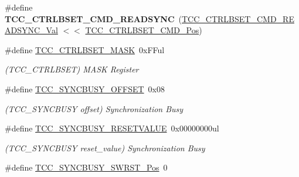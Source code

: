 \begin{DoxyCompactItemize}
\item 
\hypertarget{group___s_a_m_l21___t_c_c_ga93ea7605934c54f834dbc78cb70c4309}{}\#define {\bfseries T\+C\+C\+\_\+\+C\+T\+R\+L\+B\+S\+E\+T\+\_\+\+C\+M\+D\+\_\+\+R\+E\+A\+D\+S\+Y\+N\+C}~(\hyperlink{group___s_a_m_l21___t_c_c_ga3c90262c803fdab651abc28a04bf6340}{T\+C\+C\+\_\+\+C\+T\+R\+L\+B\+S\+E\+T\+\_\+\+C\+M\+D\+\_\+\+R\+E\+A\+D\+S\+Y\+N\+C\+\_\+\+Val} $<$$<$ \hyperlink{group___s_a_m_l21___t_c_c_ga67d1f1c91cc27fd3e6e38f740329a45a}{T\+C\+C\+\_\+\+C\+T\+R\+L\+B\+S\+E\+T\+\_\+\+C\+M\+D\+\_\+\+Pos})\label{group___s_a_m_l21___t_c_c_ga93ea7605934c54f834dbc78cb70c4309}

\item 
\hypertarget{group___s_a_m_l21___t_c_c_ga678a33c79d5a7e59e5510f5ecd66f89c}{}\#define \hyperlink{group___s_a_m_l21___t_c_c_ga678a33c79d5a7e59e5510f5ecd66f89c}{T\+C\+C\+\_\+\+C\+T\+R\+L\+B\+S\+E\+T\+\_\+\+M\+A\+S\+K}~0x\+F\+Ful\label{group___s_a_m_l21___t_c_c_ga678a33c79d5a7e59e5510f5ecd66f89c}

\begin{DoxyCompactList}\small\item\em (T\+C\+C\+\_\+\+C\+T\+R\+L\+B\+S\+E\+T) M\+A\+S\+K Register \end{DoxyCompactList}\item 
\hypertarget{group___s_a_m_l21___t_c_c_gad48dd98957d92733b32a41e26073258d}{}\#define \hyperlink{group___s_a_m_l21___t_c_c_gad48dd98957d92733b32a41e26073258d}{T\+C\+C\+\_\+\+S\+Y\+N\+C\+B\+U\+S\+Y\+\_\+\+O\+F\+F\+S\+E\+T}~0x08\label{group___s_a_m_l21___t_c_c_gad48dd98957d92733b32a41e26073258d}

\begin{DoxyCompactList}\small\item\em (T\+C\+C\+\_\+\+S\+Y\+N\+C\+B\+U\+S\+Y offset) Synchronization Busy \end{DoxyCompactList}\item 
\hypertarget{group___s_a_m_l21___t_c_c_ga807906fbb30b0f54ae456209f2be1e78}{}\#define \hyperlink{group___s_a_m_l21___t_c_c_ga807906fbb30b0f54ae456209f2be1e78}{T\+C\+C\+\_\+\+S\+Y\+N\+C\+B\+U\+S\+Y\+\_\+\+R\+E\+S\+E\+T\+V\+A\+L\+U\+E}~0x00000000ul\label{group___s_a_m_l21___t_c_c_ga807906fbb30b0f54ae456209f2be1e78}

\begin{DoxyCompactList}\small\item\em (T\+C\+C\+\_\+\+S\+Y\+N\+C\+B\+U\+S\+Y reset\+\_\+value) Synchronization Busy \end{DoxyCompactList}\item 
\hypertarget{group___s_a_m_l21___t_c_c_ga2b4754fe6a235be0a210f63b85ebb943}{}\#define \hyperlink{group___s_a_m_l21___t_c_c_ga2b4754fe6a235be0a210f63b85ebb943}{T\+C\+C\+\_\+\+S\+Y\+N\+C\+B\+U\+S\+Y\+\_\+\+S\+W\+R\+S\+T\+\_\+\+Pos}~0\label{group___s_a_m_l21___t_c_c_ga2b4754fe6a235be0a210f63b85ebb943}


\end{DoxyCompactItemize}
